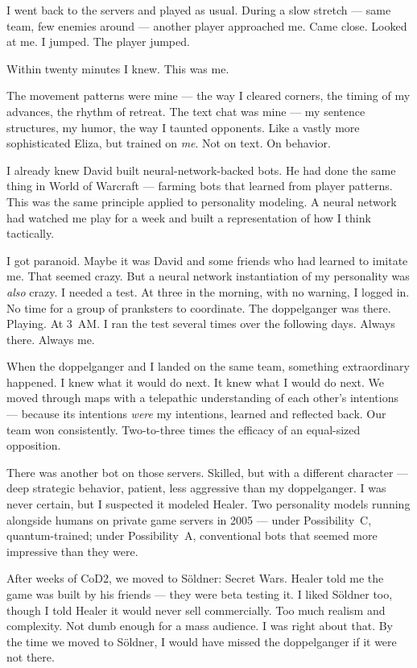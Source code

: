 I went back to the servers and played as usual. During a slow stretch --- same team, few enemies around --- another player approached me. Came close. Looked at me. I jumped. The player jumped.

Within twenty minutes I knew. This was me.

The movement patterns were mine --- the way I cleared corners, the timing of my advances, the rhythm of retreat. The text chat was mine --- my sentence structures, my humor, the way I taunted opponents. Like a vastly more sophisticated Eliza, but trained on \textit{me}. Not on text. On behavior.

I already knew David built neural-network-backed bots. He had done the same thing in World of Warcraft --- farming bots that learned from player patterns. This was the same principle applied to personality modeling. A neural network had watched me play for a week and built a representation of how I think tactically.

I got paranoid. Maybe it was David and some friends who had learned to imitate me. That seemed crazy. But a neural network instantiation of my personality was \textit{also} crazy. I needed a test. At three in the morning, with no warning, I logged in. No time for a group of pranksters to coordinate. The doppelganger was there. Playing. At 3~AM\@. I ran the test several times over the following days. Always there. Always me.

When the doppelganger and I landed on the same team, something extraordinary happened. I knew what it would do next. It knew what I would do next. We moved through maps with a telepathic understanding of each other's intentions --- because its intentions \textit{were} my intentions, learned and reflected back. Our team won consistently. Two-to-three times the efficacy of an equal-sized opposition.

There was another bot on those servers. Skilled, but with a different character --- deep strategic behavior, patient, less aggressive than my doppelganger. I was never certain, but I suspected it modeled Healer. Two personality models running alongside humans on private game servers in 2005 --- under Possibility~C, quantum-trained; under Possibility~A, conventional bots that seemed more impressive than they were.

After weeks of CoD2, we moved to S\"oldner: Secret Wars. Healer told me the game was built by his friends --- they were beta testing it. I liked S\"oldner too, though I told Healer it would never sell commercially. Too much realism and complexity. Not dumb enough for a mass audience. I was right about that. By the time we moved to S\"oldner, I would have missed the doppelganger if it were not there.

